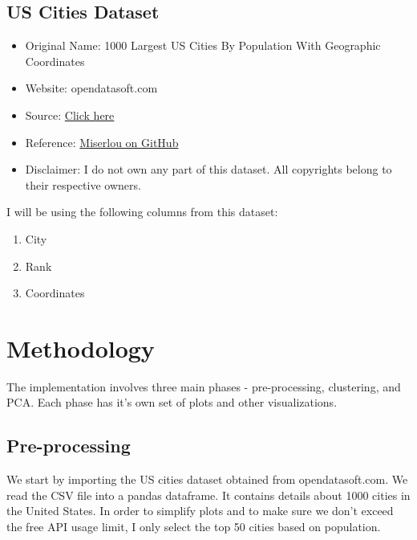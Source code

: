 \documentclass[12pt, a4paper]{report}
\begin{document}
\subsection*{US Cities Dataset}
\begin{itemize}
	\item Original Name: 1000 Largest US Cities By Population With Geographic Coordinates
	\item Website: opendatasoft.com
	\item Source: \href{https://public.opendatasoft.com/explore/dataset/1000-largest-us-cities-by-population-with-geographic-coordinates/export/?sort=-rank&dataChart=eyJxdWVyaWVzIjpbeyJjb25maWciOnsiZGF0YXNldCI6IjEwMDAtbGFyZ2VzdC11cy1jaXRpZXMtYnktcG9wdWxhdGlvbi13aXRoLWdlb2dyYXBoaWMtY29vcmRpbmF0ZXMiLCJvcHRpb25zIjp7InNvcnQiOiItcmFuayJ9fSwiY2hhcnRzIjpbeyJhbGlnbk1vbnRoIjp0cnVlLCJ0eXBlIjoiY29sdW1uIiwiZnVuYyI6IkFWRyIsInlBeGlzIjoicmFuayIsInNjaWVudGlmaWNEaXNwbGF5Ijp0cnVlLCJjb2xvciI6IiNGRjUxNUEifV0sInhBeGlzIjoiY2l0eSIsIm1heHBvaW50cyI6NTAsInNvcnQiOiIifV0sInRpbWVzY2FsZSI6IiIsImRpc3BsYXlMZWdlbmQiOnRydWUsImFsaWduTW9udGgiOnRydWV9}{Click here}
	\item Reference: \href{https://gist.github.com/Miserlou/c5cd8364bf9b2420bb29#file-cities-json}{Miserlou on GitHub} 
	\item Disclaimer: I do not own any part of this dataset. All copyrights belong to their respective owners. 
\end{itemize}
I will be using the following columns from this dataset:
\begin{enumerate}
	\item City
	\item Rank
	\item Coordinates 
\end{enumerate}

\section*{Methodology}	
The implementation involves three main phases - pre-processing, clustering, and PCA. Each phase has it's own set of plots and other visualizations. 
\subsection*{Pre-processing}
We start by importing the US cities dataset obtained from opendatasoft.com. We read the CSV file into a pandas dataframe. It contains details about 1000 cities in the United States. In order to simplify plots and to make sure we don't exceed the free API usage limit, I only select the top 50 cities based on population. 
\end{document}
